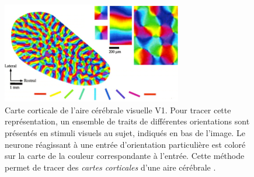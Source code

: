 \documentclass[../main]{subfiles}
\begin{document}
\begin{figure}
    \centering
    \includegraphics[width=0.7\textwidth]{v1.jpg}
    \caption{Carte corticale de l'aire cérébrale visuelle V1. Pour tracer cette représentation, un ensemble de traits de différentes orientations sont présentés en stimuli visuels au sujet, indiqués en bas de l'image. Le neurone réagissant à une entrée d'orientation particulière est coloré sur la carte de la couleur correspondante à l'entrée. Cette méthode permet de tracer des \emph{cartes corticales} d'une aire cérébrale \cite{Bosking1997OrientationSA}. \label{fig:v1_repr}}
\end{figure}
\end{document}
